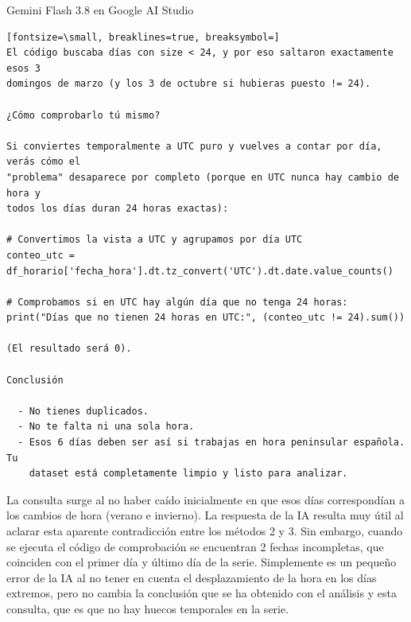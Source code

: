 \documentclass[12pt,a4paper,oneside]{book}
\begin{document}
\begin{iaresp}{Gemini Flash 3.8 en Google AI Studio}
\begin{Verbatim}[fontsize=\small, breaklines=true, breaksymbol=]
El código buscaba días con size < 24, y por eso saltaron exactamente esos 3
domingos de marzo (y los 3 de octubre si hubieras puesto != 24).

¿Cómo comprobarlo tú mismo?

Si conviertes temporalmente a UTC puro y vuelves a contar por día, verás cómo el
"problema" desaparece por completo (porque en UTC nunca hay cambio de hora y
todos los días duran 24 horas exactas):

# Convertimos la vista a UTC y agrupamos por día UTC
conteo_utc = df_horario['fecha_hora'].dt.tz_convert('UTC').dt.date.value_counts()

# Comprobamos si en UTC hay algún día que no tenga 24 horas:
print("Días que no tienen 24 horas en UTC:", (conteo_utc != 24).sum())

(El resultado será 0).

Conclusión

  - No tienes duplicados.
  - No te falta ni una sola hora.
  - Esos 6 días deben ser así si trabajas en hora peninsular española. Tu
    dataset está completamente limpio y listo para analizar.

\end{Verbatim}
\end{iaresp}
\begin{iaanalisis}
La consulta surge al no haber caído inicialmente en que esos días correspondían a los cambios de hora (verano e invierno). La respuesta de la IA resulta muy útil al aclarar esta aparente contradicción entre los métodos 2 y 3. Sin embargo, cuando se ejecuta el código de comprobación se encuentran 2 fechas incompletas, que coinciden con el primer día y último día de la serie. Simplemente es un pequeño error de la IA al no tener en cuenta el desplazamiento de la hora en los días extremos, pero no cambia la conclusión que se ha obtenido con el análisis y esta consulta, que es que no hay huecos temporales en la serie.
\end{iaanalisis}
\end{document}
